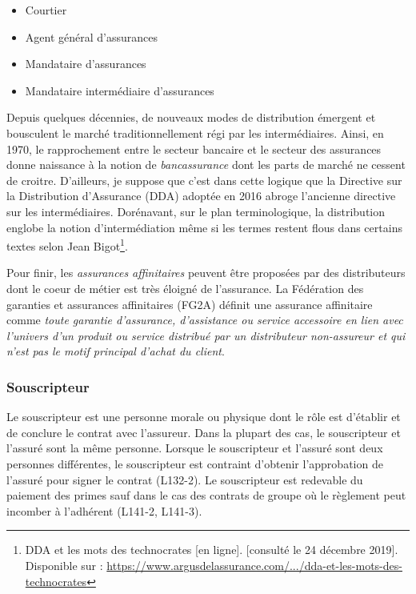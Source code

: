 \documentclass{article}
\begin{document}
\begin{itemize}
    \item Courtier
    \item Agent général d'assurances
    \item Mandataire d'assurances
    \item Mandataire intermédiaire d'assurances
\end{itemize}

Depuis quelques décennies, de nouveaux modes de distribution émergent et bousculent le marché traditionnellement régi par les intermédiaires. Ainsi, en 1970, le rapprochement entre le secteur bancaire et le secteur des assurances donne naissance à la notion de \textit{bancassurance} dont les parts de marché ne cessent de croitre. D'ailleurs, je suppose que c'est dans cette logique que la Directive sur la Distribution d'Assurance (DDA) adoptée en 2016 abroge l'ancienne directive sur les intermédiaires. Dorénavant, sur le plan terminologique, la distribution englobe la notion d'intermédiation même si les termes restent flous dans certains textes selon Jean Bigot\footnote{DDA et les mots des technocrates
[en ligne]. [consulté le 24 décembre 2019]. Disponible sur : \href{https://www.argusdelassurance.com/juriscope/decryptages/dda-et-les-mots-des-technocrates.145990}{https://www.argusdelassurance.com/.../dda-et-les-mots-des-technocrates}}.

Pour finir, les \textit{assurances affinitaires} peuvent être proposées par des distributeurs dont le coeur de métier est très éloigné de l'assurance. La Fédération des garanties et assurances affinitaires (FG2A) définit une assurance affinitaire comme \textit{toute garantie d'assurance, d'assistance ou service accessoire en lien avec l'univers d'un produit ou service distribué par un distributeur non-assureur et qui n'est pas le motif principal d'achat du client}.

\subsubsection{Souscripteur}
Le souscripteur est une personne morale ou physique dont le rôle est d'établir et de conclure le contrat avec l'assureur. Dans la plupart des cas, le souscripteur et l'assuré sont la même personne. Lorsque le souscripteur et l'assuré sont deux personnes différentes, le souscripteur est contraint d'obtenir l'approbation de l'assuré pour signer le contrat (L132-2). Le souscripteur est redevable du paiement des primes sauf dans le cas des contrats de groupe où le règlement peut incomber à l'adhérent (L141-2, L141-3).
\end{document}
